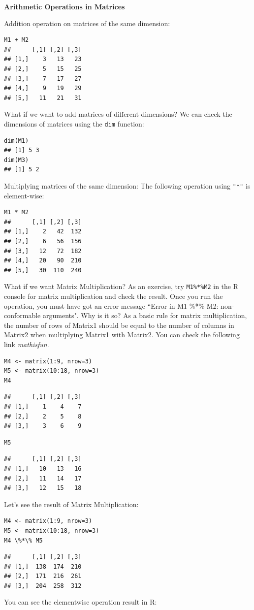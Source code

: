 \documentclass[12pt]{book}
\begin{document}
\textbf{Arithmetic Operations in Matrices}

Addition operation on matrices of the same dimension:

\begin{verbatim}
M1 + M2
##      [,1] [,2] [,3]
## [1,]    3   13   23
## [2,]    5   15   25
## [3,]    7   17   27
## [4,]    9   19   29
## [5,]   11   21   31
\end{verbatim}

What if we want to add matrices of different dimensions? We can check the dimensions of matrices using the \texttt{dim} function:

\begin{verbatim}
dim(M1)
## [1] 5 3
dim(M3)
## [1] 5 2
\end{verbatim}

Multiplying matrices of the same dimension: The following operation using \texttt{"*"} is element-wise:

\begin{verbatim}
M1 * M2
##      [,1] [,2] [,3]
## [1,]    2   42  132
## [2,]    6   56  156
## [3,]   12   72  182
## [4,]   20   90  210
## [5,]   30  110  240
\end{verbatim}
What if we want Matrix Multiplication? As an exercise, try \texttt{M1\%*\%M2} in the R console for matrix multiplication and check the result. Once you run the operation, you must have got an error message ``Error in M1 \%*\% M2: non-conformable arguments". Why is it so? As a basic rule for matrix multiplication, the number of rows of Matrix1 should be equal to the number of columns in Matrix2 when multiplying Matrix1 with Matrix2. You can check the following link \textit{mathisfun}.

\begin{verbatim}
M4 <- matrix(1:9, nrow=3)
M5 <- matrix(10:18, nrow=3)
M4
\end{verbatim}
\begin{verbatim}
##      [,1] [,2] [,3]
## [1,]    1    4    7
## [2,]    2    5    8
## [3,]    3    6    9
\end{verbatim}
\begin{verbatim}
M5
\end{verbatim}
\begin{verbatim}
##      [,1] [,2] [,3]
## [1,]   10   13   16
## [2,]   11   14   17
## [3,]   12   15   18
\end{verbatim}
Let's see the result of Matrix Multiplication:

\begin{verbatim}
M4 <- matrix(1:9, nrow=3)
M5 <- matrix(10:18, nrow=3)
M4 \%*\% M5
\end{verbatim}
\begin{verbatim}
##      [,1] [,2] [,3]
## [1,]  138  174  210
## [2,]  171  216  261
## [3,]  204  258  312
\end{verbatim}
You can see the elementwise operation result in R:
\end{document}
